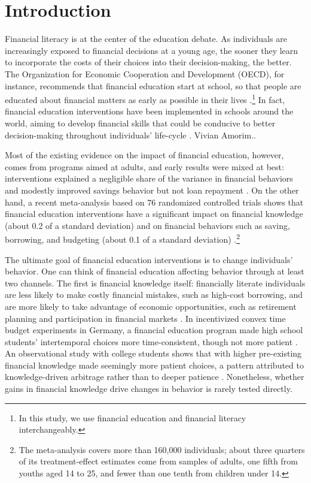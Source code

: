
\section{Introduction} \label{sec:introc1}

Financial literacy is at the center of the education debate. As individuals are increasingly exposed to financial decisions at a young age, the sooner they learn to incorporate the costs of their choices into their decision-making, the better. The Organization for Economic Cooperation and Development (OECD), for instance, recommends that financial education start at school, so that people are educated about financial matters as early as possible in their lives \citep[][Good Practice 9]{OECD2005}.\footnote{In this study, we use financial education and financial literacy interchangeably.} In fact, financial education interventions have been implemented in schools around the world, aiming to develop financial skills that could be conducive to better decision-making throughout individuals' life-cycle \citep{Bruhn2016, berry2018impact, Luhrmann2018, gill2019effects, batty2020experiential, de2021effect, frisancho2023school, bover2026impact}. Vivian Amorim.. 

Most of the existing evidence on the impact of financial education, however, comes from programs aimed at adults, and early results were mixed at best: interventions explained a negligible share of the variance in financial behaviors \citep{Fernandes2014} and modestly improved savings behavior but not loan repayment \citep{Miller2015}. On the other hand, a recent meta-analysis based on 76 randomized controlled trials shows that financial education interventions have a significant impact on financial knowledge (about 0.2 of a standard deviation) and on financial behaviors such as saving, borrowing, and budgeting (about 0.1 of a standard deviation) \citep{kaiser2022financial}.\footnote{The meta-analysis covers more than 160,000 individuals; about three quarters of its treatment-effect estimates come from samples of adults, one fifth from youths aged 14 to 25, and fewer than one tenth from children under 14.}

The ultimate goal of financial education interventions is to change individuals' behavior. One can think of financial education affecting behavior through at least two channels. The first is financial knowledge itself: financially literate individuals are less likely to make costly financial mistakes, such as high-cost borrowing, and are more likely to take advantage of economic opportunities, such as retirement planning and participation in financial markets \citep{Lusardi2014}. In incentivized convex time budget experiments in Germany, a financial education program made high school students' intertemporal choices more time-consistent, though not more patient \citep{Luhrmann2018}. An observational study with college students shows that with higher pre-existing financial knowledge made seemingly more patient choices, a pattern attributed to knowledge-driven arbitrage rather than to deeper patience \citep{oberrauch2022cognitive}. Nonetheless, whether gains in financial knowledge drive changes in behavior is rarely tested directly.

